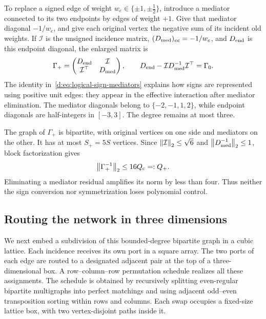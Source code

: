 To replace a signed edge of weight $w_e\in\{\pm1,\pm\tfrac12\}$,
introduce a mediator connected to its two endpoints by edges of weight
$+1$. Give that mediator diagonal $-1/w_e$, and give each original vertex
the negative sum of its incident old weights. If $\mathcal I$ is the unsigned
incidence matrix, $(D_{\rm med})_{ee}=-1/w_e$, and $D_{\rm end}$ is this endpoint diagonal,
the enlarged matrix is
\begin{equation}
 \Gamma_+=\begin{pmatrix}D_{\rm end}&\mathcal I\\\mathcal I^\top&D_{\rm med}\end{pmatrix},
 \qquad D_{\rm end}-\mathcal ID_{\rm med}^{-1}\mathcal I^\top=\Gamma_0.
 \label{d:eq:logical-sign-mediators}
\end{equation}
The identity in~\eqref{d:eq:logical-sign-mediators} explains how signs are
represented using positive unit edges: they appear in the effective
interaction after mediator elimination. The mediator diagonals belong to
$\{-2,-1,1,2\}$, while endpoint diagonals are half-integers in $[-3,3]$.
The degree remains at most three.

The graph of $\Gamma_+$ is bipartite, with original vertices on one side and
mediators on the other. It has at most $S_+=5S$ vertices. Since
$\left\lVert \mathcal I\right\rVert_2\le\sqrt6$ and $\left\lVert D_{\rm med}^{-1}\right\rVert_2\le1$, block factorization
gives
\begin{equation}
 \left\lVert \Gamma_+^{-1}\right\rVert_2\le16Q_{\rm c}=:Q_+.
 \label{d:eq:logical-positive-inverse}
\end{equation}
Eliminating a mediator residual amplifies its norm by less than four.
Thus neither the sign conversion nor symmetrization loses polynomial
control.

\subsection{Routing the network in three dimensions}

We next embed a subdivision of this bounded-degree bipartite graph in a
cubic lattice. Each incidence receives its own port in a square array.
The two ports of each edge are routed to a designated adjacent pair at
the top of a three-dimensional box. A row--column--row permutation
schedule realizes all these assignments. The schedule is obtained by
recursively splitting even-regular bipartite multigraphs into perfect
matchings and using adjacent odd--even transposition sorting within rows
and columns. Each swap occupies a fixed-size lattice box, with two
vertex-disjoint paths inside it.

